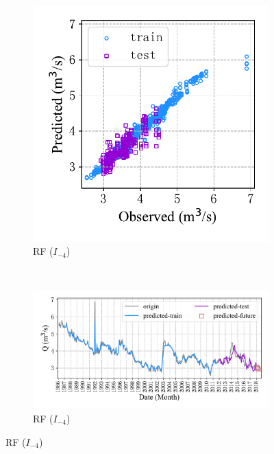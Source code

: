 \begin{figure}[!htbp]
\begin{subfigure}[b]{0.615\textwidth}
  \end{subfigure}
  \\
  \begin{subfigure}[b]{0.305\textwidth}
    \includegraphics[width=\textwidth]{Img/chap4_spr/out4/spr_scatter_in_4_out_4_rf.pdf}
    \vspace{-1.2cm}
    \caption{RF ($I_{-4}$)}
    \label{fig:spr_scatter_in_4_out_4_rf}
  \end{subfigure}
  ~
  \begin{subfigure}[b]{0.615\textwidth}
    \includegraphics[width=\textwidth]{Img/chap4_spr/out4/spr_series_in_4_out_4_rf.pdf}
    \vspace{-1.2cm}
    \caption{RF ($I_{-4}$)}
    \label{fig:spr_series_in_4_out_4_rf}
  \end{subfigure}
  \label{fig:spr_out_4}
\end{figure}

